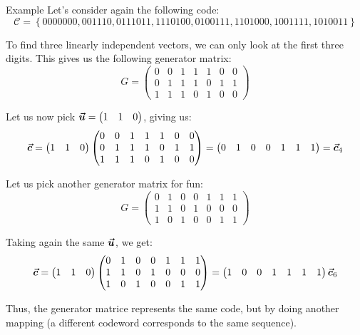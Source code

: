 \documentclass[a4paper]{article}
\begin{document}
\begin{parag}{Example}
    Let's consider again the following code:
    \[\mathcal{C} = \left\{0000000, 001110, 0111011, 1110100, 0100111, 1101000, 1001111, 1010011\right\}\]

    To find three linearly independent vectors, we can only look at the first three digits. This gives us the following generator matrix:
    \[G = \begin{pmatrix} 0 & 0 & 1 & 1 & 1 & 0 & 0 \\ 0 & 1 & 1 & 1 & 0 & 1 & 1 \\ 1 & 1 & 1 & 0 & 1 & 0 & 0 \end{pmatrix} \]

    Let us now pick $\bm{\protect\vec{u}} = \begin{pmatrix} 1 & 1 & 0 \end{pmatrix} $, giving us:
    \[\bm{\protect\vec{c}} = \begin{pmatrix} 1 & 1 & 0 \end{pmatrix} \begin{pmatrix} 0 & 0 & 1 & 1 & 1 & 0 & 0 \\ 0 & 1 & 1 & 1 & 0 & 1 & 1 \\ 1 & 1 & 1 & 0 & 1 & 0 & 0 \end{pmatrix} = \begin{pmatrix} 0 & 1 & 0 & 0 & 1 & 1 & 1 \end{pmatrix} = \bm{\protect\vec{c}}_4\]

    Let us pick another generator matrix for fun:
    \[G = \begin{pmatrix} 0 & 1 & 0 & 0 & 1 & 1 & 1 \\ 1 & 1 & 0 & 1 & 0 & 0 & 0 \\ 1 & 0 & 1 & 0 & 0 & 1 & 1 \end{pmatrix} \]

    Taking again the same $\bm{\protect\vec{u}}$, we get:
    \[\bm{\protect\vec{c}} = \begin{pmatrix} 1 & 1 & 0 \end{pmatrix} \begin{pmatrix} 0 & 1 & 0 & 0 & 1 & 1 & 1 \\ 1 & 1 & 0 & 1 & 0 & 0 & 0 \\ 1 & 0 & 1 & 0 & 0 & 1 & 1 \end{pmatrix} = \begin{pmatrix} 1 & 0 & 0 & 1 & 1 & 1 & 1 \end{pmatrix} \bm{\protect\vec{c}}_6\]

    Thus, the generator matrice represents the same code, but by doing another mapping (a different codeword corresponds to the same sequence).
\end{parag}
\end{document}

